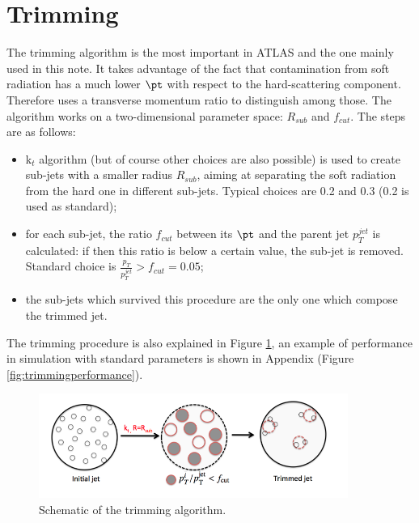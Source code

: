 


\section{Trimming}\label{sec:trimming}

The trimming algorithm is the most important in ATLAS and the one mainly used in this note. It takes advantage of the fact that contamination from soft radiation has a much lower $\pt$ with respect to the hard-scattering component. Therefore uses a transverse momentum ratio to distinguish among those. The algorithm works on a two-dimensional parameter space: $R_{sub}$ and $f_{cut}$.
The steps are as follows:
\begin{itemize}
 \item k$_t$ algorithm (but of course other choices are also possible) is used to create sub-jets with a smaller radius $R_{sub}$, aiming at separating the soft radiation from the hard one in different sub-jets. Typical choices are 0.2 and 0.3 (0.2 is used as standard);
 \item for each sub-jet, the ratio $f_{cut}$ between its $\pt$ and the parent jet $p_T^{jet}$ is calculated: if then this ratio is below a certain value, the sub-jet is removed. Standard choice is $\frac{p_{T}}{p_{T}^{jet}} > f_{cut}=0.05$;
 \item the sub-jets which survived this procedure are the only one which compose the trimmed jet.
\end{itemize}

The trimming procedure is also explained in Figure \ref{fig:trimming}, an example of performance in simulation with standard parameters is shown in Appendix (Figure \ref{fig:trimmingperformance}).

\begin{figure}[!ht]
  \centering
      \includegraphics[width=0.9\textwidth]{jet_part/grooming/Figura_4.png}
  \caption{Schematic of the trimming algorithm.}
  \label{fig:trimming}
\end{figure}


